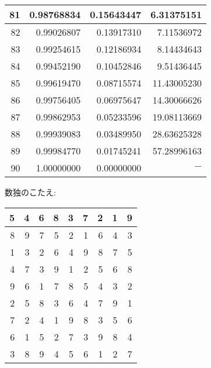 \documentclass{jsarticle}
\begin{document}
\begin{longtable}{|r|r|r|r|}
	81	&0.98768834	&0.15643447	&6.31375151	\\ \hline
	82	&0.99026807	&0.13917310	&7.11536972	\\ \hline
	83	&0.99254615	&0.12186934	&8.14434643	\\ \hline
	84	&0.99452190	&0.10452846	&9.51436445	\\ \hline
	85	&0.99619470	&0.08715574	&11.43005230	\\ \hline
	86	&0.99756405	&0.06975647	&14.30066626	\\ \hline
	87	&0.99862953	&0.05233596	&19.08113669	\\ \hline
	88	&0.99939083	&0.03489950	&28.63625328	\\ \hline
	89	&0.99984770	&0.01745241	&57.28996163	\\ \hline
	90	&1.00000000	&0.00000000	&$\mathrm{-}$	\\ \hline
\end{longtable}
\vspace{15zw}
数独のこたえ:
\begin{table}[htb]
	\centering
	\begin{tabular}{|r|r|r||r|r|r||r|r|r|}\hline
		5	&4	&6	&8	&3	&7	&2	&1	&9	\\ \hline
		8	&9	&7	&5	&2	&1	&6	&4	&3	\\ \hline
		1	&3	&2	&6	&4	&9	&8	&7	&5	\\ \hhline{|=|=|=#=|=|=#=|=|=|}
		4	&7	&3	&9	&1	&2	&5	&6	&8	\\ \hline
		9	&6	&1	&7	&8	&5	&4	&3	&2	\\ \hline
		2	&5	&8	&3	&6	&4	&7	&9	&1	\\ \hhline{|=|=|=#=|=|=#=|=|=|}
		7	&2	&4	&1	&9	&8	&3	&5	&6	\\ \hline
		6	&1	&5	&2	&7	&3	&9	&8	&4	\\ \hline
		3	&8	&9	&4	&5	&6	&1	&2	&7	\\ \hline
	\end{tabular}
\end{table}
\end{document}
